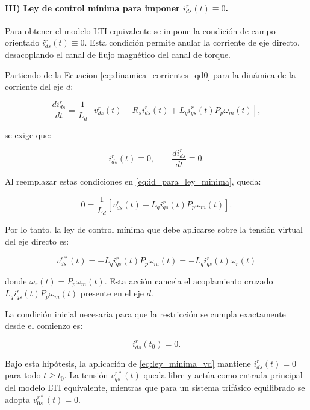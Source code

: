 \documentclass[10pt,a4paper]{article}
\begin{document}
\paragraph{III) Ley de control mínima para imponer $i_{ds}^{r}(t)\equiv 0$.}
Para obtener el modelo LTI equivalente se impone la condición de campo orientado $i_{ds}^{r}(t)\equiv0$. Esta condición permite anular la corriente de eje directo, desacoplando el canal de flujo magnético del canal de torque.

Partiendo de la Ecuacion \eqref{eq:dinamica_corrientes_qd0} para la dinámica de la corriente del eje $d$:

\begin{equation}
	\frac{di_{ds}^{r}}{dt}
	=
	\frac{1}{L_d}
	\left[
	v_{ds}^r(t)
	-
	R_s i_{ds}^r(t)
	+
	L_q i_{qs}^r(t)P_p\omega_m(t)
	\right],
	\label{eq:id_para_ley_minima}
\end{equation}

se exige que:

\begin{equation*}
	i_{ds}^r(t)\equiv0,
	\qquad
	\frac{di_{ds}^{r}}{dt}\equiv0.
\end{equation*}

Al reemplazar estas condiciones en \eqref{eq:id_para_ley_minima}, queda:

\begin{equation*}
	0=
	\frac{1}{L_d}
	\left[
	v_{ds}^r(t)+L_q i_{qs}^r(t)P_p\omega_m(t)
	\right].
\end{equation*}

Por lo tanto, la ley de control mínima que debe aplicarse sobre la tensión virtual del eje directo es:

\begin{equation}
	\boxed{
		v_{ds}^{r*}(t)
		=
		-L_q i_{qs}^{r}(t)P_p\omega_m(t)
		=
		-L_q i_{qs}^{r}(t)\omega_r(t)
	}
	\label{eq:ley_minima_vd}
\end{equation}

donde $\omega_r(t)=P_p\omega_m(t)$. Esta acción cancela el acoplamiento cruzado $L_q i_{qs}^r(t)P_p\omega_m(t)$ presente en el eje $d$.

La condición inicial necesaria para que la restricción se cumpla exactamente desde el comienzo es:

\begin{equation}
	i_{ds}^r(t_0)=0.
	\label{eq:hipotesis_inicial_id}
\end{equation}

Bajo esta hipótesis, la aplicación de \eqref{eq:ley_minima_vd} mantiene $i_{ds}^r(t)=0$ para todo $t\geq t_0$. La tensión $v_{qs}^{r*}(t)$ queda libre y actúa como entrada principal del modelo LTI equivalente, mientras que para un sistema trifásico equilibrado se adopta $v_{0s}^{r*}(t)=0$.
\end{document}
